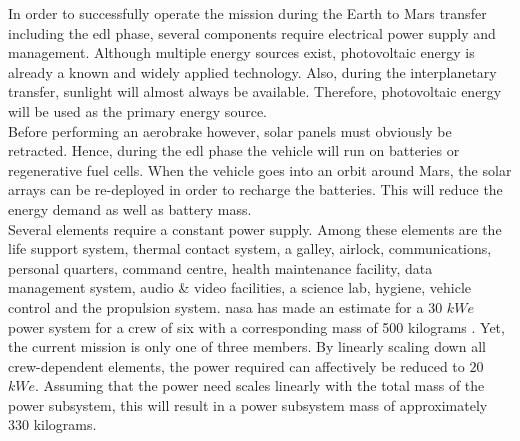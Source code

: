 In order to successfully operate the mission during the Earth to Mars transfer including the \gls{edl} phase, several components require electrical power supply and management. Although multiple  energy sources exist, photovoltaic energy is already a known and widely applied technology. Also, during the interplanetary transfer, sunlight will almost always be available. Therefore, photovoltaic energy will be used as the primary energy source.\\
 
Before performing an aerobrake however, solar panels must obviously be retracted. Hence, during the \gls{edl} phase the vehicle will run on batteries or regenerative fuel cells. When the vehicle goes into an orbit around Mars, the solar arrays can be re-deployed in order to recharge the batteries. This will reduce the energy demand as well as battery mass.\\

Several elements require a constant power supply. Among these elements are the life support system, thermal contact system, a galley, airlock, communications, personal quarters, command centre, health maintenance facility, data management system, audio \& video facilities, a science lab, hygiene, vehicle control and the propulsion system. \gls{nasa} has made an estimate for a $30$ $kWe$ power system for a crew of six with a corresponding mass of 500 kilograms \cite{Hoffman1997}. Yet, the current mission is only one of three members. By linearly scaling down all crew-dependent elements, the power required can affectively be reduced to $20$ $kWe$. Assuming that the power need scales linearly with the total mass of the power subsystem, this will result in a power subsystem mass of approximately $330$ kilograms.\\







